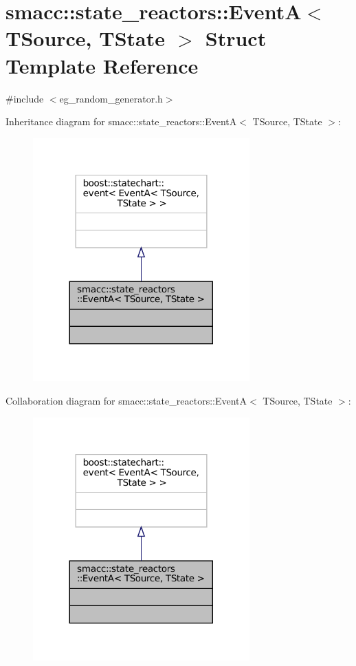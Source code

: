 \hypertarget{structsmacc_1_1state__reactors_1_1EventA}{}\section{smacc\+:\+:state\+\_\+reactors\+:\+:EventA$<$ T\+Source, T\+State $>$ Struct Template Reference}
\label{structsmacc_1_1state__reactors_1_1EventA}


{\ttfamily \#include $<$eg\+\_\+random\+\_\+generator.\+h$>$}



Inheritance diagram for smacc\+:\+:state\+\_\+reactors\+:\+:EventA$<$ T\+Source, T\+State $>$\+:
\nopagebreak
\begin{figure}[H]
\begin{center}
\leavevmode
\includegraphics[width=236pt]{structsmacc_1_1state__reactors_1_1EventA__inherit__graph}
\end{center}
\end{figure}


Collaboration diagram for smacc\+:\+:state\+\_\+reactors\+:\+:EventA$<$ T\+Source, T\+State $>$\+:
\nopagebreak
\begin{figure}[H]
\begin{center}
\leavevmode
\includegraphics[width=236pt]{structsmacc_1_1state__reactors_1_1EventA__coll__graph}
\end{center}
\end{figure}


